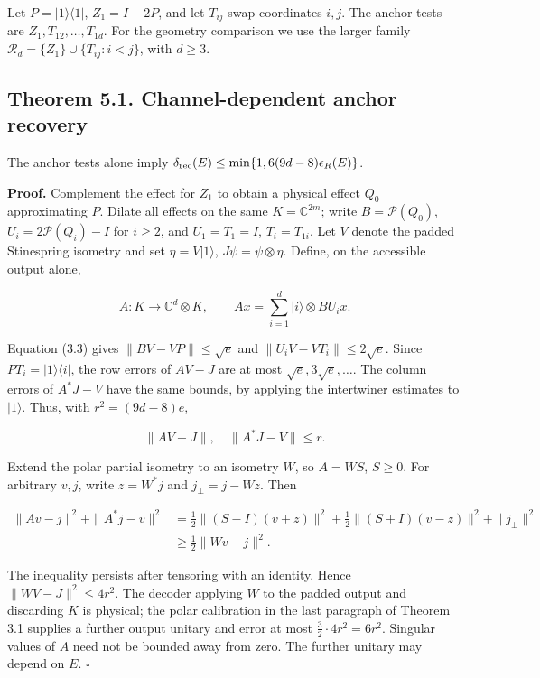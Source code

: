 \documentclass[11pt]{article}
\begin{document}
Let \(P=|1\rangle\langle1|\), \(Z_1=I-2P\), and let \(T_{ij}\) swap
coordinates \(i,j\). The anchor tests are \(Z_1,T_{12},\ldots,T_{1d}\).
For the geometry comparison we use the larger family
\(\mathcal R_d=\{Z_1\}\cup\{T_{ij}:i<j\}\), with \(d\ge3\).

\subsection*{Theorem 5.1. Channel-dependent anchor recovery}

The anchor tests alone imply
\(\delta_{\rm rec}(E)\le\min\{1,6(9d-8)\epsilon_R(E)\}\).

\textbf{Proof.} Complement the effect for \(Z_1\) to obtain a physical effect
\(Q_0\) approximating \(P\). Dilate all effects on the same
\(K=\mathbb C^{2m}\); write \(B=\mathcal P(Q_0)\),
\(U_i=2\mathcal P(Q_i)-I\) for \(i\ge2\), and \(U_1=T_1=I\),
\(T_i=T_{1i}\). Let \(V\) denote the padded Stinespring isometry and set
\(\eta=V|1\rangle\), \(J\psi=\psi\otimes\eta\). Define, on the
accessible output alone,

\[
A:K\to\mathbb C^d\otimes K,\qquad
Ax=\sum_{i=1}^d|i\rangle\otimes BU_ix.
\tag{5.1}
\]

Equation (3.3) gives \(\|BV-VP\|\le\sqrt e\) and
\(\|U_iV-VT_i\|\le2\sqrt e\). Since \(PT_i=|1\rangle\langle i|\),
the row errors of \(AV-J\) are at most \(\sqrt e,3\sqrt e,\ldots\).
The column errors of \(A^*J-V\) have the same bounds, by applying the
intertwiner estimates to \(|1\rangle\). Thus, with \(r^2=(9d-8)e\),

\[
\|AV-J\|,\quad\|A^*J-V\|\le r.
\tag{5.2}
\]

Extend the polar partial isometry to an isometry \(W\), so \(A=WS\),
\(S\ge0\). For arbitrary \(v,j\), write \(z=W^*j\) and
\(j_\perp=j-Wz\). Then

\[
\begin{aligned}
\|Av-j\|^2+\|A^*j-v\|^2
&=\tfrac12\|(S-I)(v+z)\|^2+
\tfrac12\|(S+I)(v-z)\|^2+\|j_\perp\|^2\\
&\ge\tfrac12\|Wv-j\|^2.
\end{aligned}
\tag{5.3}
\]

The inequality persists after tensoring with an identity. Hence
\(\|WV-J\|^2\le4r^2\). The decoder applying \(W\) to the padded
output and discarding \(K\) is physical; the polar calibration in the last
paragraph of Theorem 3.1 supplies a further output unitary and error at most
\(\tfrac32\cdot4r^2=6r^2\). Singular values of \(A\) need not be bounded
away from zero. The further unitary may depend on \(E\). \hfill\(\square\)
\end{document}
